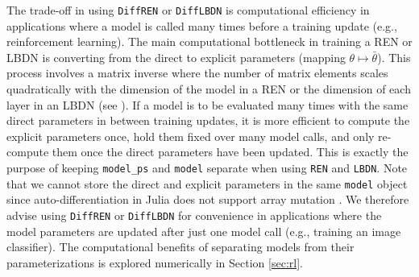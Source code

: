The trade-off in using \verb|DiffREN| or \verb|DiffLBDN| is computational efficiency in applications where a model is called many times before a training update (e.g., reinforcement learning). The main computational bottleneck in training a REN or LBDN is converting from the direct to explicit parameters (mapping $\theta \mapsto \bar{\theta}$). This process involves a matrix inverse where the number of matrix elements scales quadratically with the dimension of the model in a REN or the dimension of each layer in an LBDN (see \cite{Revay++2021b,Wang+Manchester2023}). If a model is to be evaluated many times with the same direct parameters in between training updates, it is more efficient to compute the explicit parameters once, hold them fixed over many model calls, and only re-compute them once the direct parameters have been updated. This is exactly the purpose of keeping \verb|model_ps| and \verb|model| separate when using \verb|REN| and \verb|LBDN|. Note that we cannot store the direct and explicit parameters in the same \verb|model| object since auto-differentiation in Julia does not support array mutation \cite{Innes2018b}. We therefore advise using \verb|DiffREN| or \verb|DiffLBDN| for convenience in applications where the model parameters are updated after just one model call (e.g., training an image classifier). The computational benefits of separating models from their parameterizations is explored numerically in Section \ref{sec:rl}.
